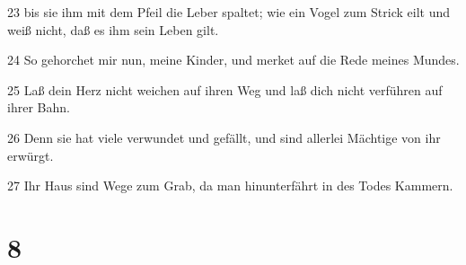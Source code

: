 \par 23 bis sie ihm mit dem Pfeil die Leber spaltet; wie ein Vogel zum Strick eilt und weiß nicht, daß es ihm sein Leben gilt.
\par 24 So gehorchet mir nun, meine Kinder, und merket auf die Rede meines Mundes.
\par 25 Laß dein Herz nicht weichen auf ihren Weg und laß dich nicht verführen auf ihrer Bahn.
\par 26 Denn sie hat viele verwundet und gefällt, und sind allerlei Mächtige von ihr erwürgt.
\par 27 Ihr Haus sind Wege zum Grab, da man hinunterfährt in des Todes Kammern.

\chapter{8}


